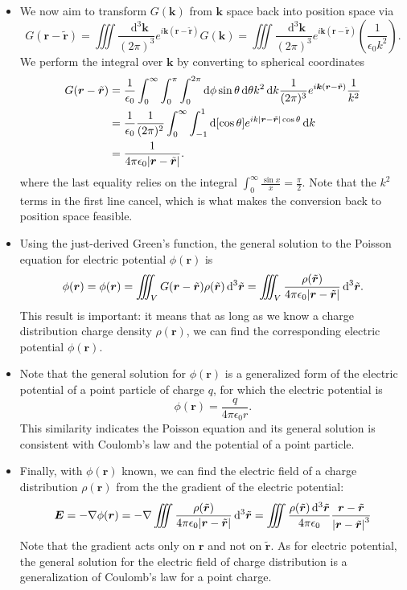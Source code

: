 \documentclass[11pt, a4paper]{article}
\newcommand{\diff}{\mathop{}\!\mathrm{d}} %
\newcommand{\dtr}{\diff^{3} \tilde{\r}}  %
\newcommand{\dk}{\diff^{3} \vec{k}}  %
\renewcommand{\vec}[1]{\bm{#1}} %
\renewcommand{\t}[1]{\tilde{#1}} %
\renewcommand{\r}{\vec{r}}
\renewcommand{\k}{\vec{k}}
\newcommand{\E}{\vec{E}} %
\newcommand{\ee}{\epsilon_{0}}  %
\renewcommand{\grad}{\nabla}
\begin{document}
\begin{itemize}
	\item We now aim to transform $ G(\k) $ from $ \k $ space back into position space via
	\begin{equation*}
		G(\r - \t{\r}) = \iiint \frac{\dk}{(2\pi)^{3}}e^{i\k(\r - \t{\r})}G(\k) = \iiint \frac{\dk}{(2\pi)^{3}}e^{i\k(\r - \t{\r})}\left(\frac{1}{\ee k^{2}}\right).
	\end{equation*}
	We perform the integral over $ \k $ by converting to spherical coordinates
	\begin{align*}
		G(\r - \t{\r}) &= \frac{1}{\ee}\int_{0}^{\infty} \int_{0}^{\pi} \int_{0}^{2\pi} \diff \phi \sin \theta \diff \theta k^{2} \diff k \frac{1}{(2\pi)^{3}}e^{i\k(\r - \t{\r})} \frac{1}{k^{2}} \\
		& = \frac{1}{\ee}\frac{1}{(2\pi)^{2}}\int_{0}^{\infty} \int_{-1}^{1} \diff [\cos \theta]  e^{ik\abs{\r - \t{\r}}\cos \theta} \diff k\\
		& = \frac{1}{4\pi \ee \abs{\r - \t{\r}}}.
	\end{align*}
	where the last equality relies on the integral $ \int_{0}^{\infty}\frac{\sin x}{x} = \frac{\pi}{2} $. Note that the $ k^{2} $ terms in the first line cancel, which is what makes the conversion back to position space feasible.
	
	\item  Using the just-derived Green's function, the general solution to the Poisson equation for electric potential $ \phi(\r) $  is
	\begin{equation*}
		\phi(\r) = \phi(\r) = \iiint_{V} G(\r - \t{\r})\rho(\t{\r}) \dtr = \iiint_{V} \frac{\rho(\t{\r})}{4\pi \ee \abs{\r - \t{\r}}}\dtr.
	\end{equation*}
	This result is important: it means that as long as we know a charge distribution charge density $ \rho(\r) $, we can find the corresponding electric potential $ \phi(\r) $. 
	
	\item Note that the general solution for $ \phi(\r) $ is a generalized form of the electric potential of a point particle of charge $ q $, for which the electric potential is
	\begin{equation*}
		\phi(\r) = \frac{q}{4\pi \ee r}.
	\end{equation*}
	This similarity indicates the Poisson equation and its general solution is consistent with Coulomb's law and the potential of a point particle.
	

	
	\item Finally, with $ \phi(\r) $ known, we can find the electric field of a charge distribution $ \rho(\r) $ from the the gradient of the electric potential:
	\begin{equation*}
		\E = - \grad \phi(\r) = - \grad \iiint \frac{\rho(\t{\r})}{4\pi \ee \abs{\r - \t{\r}}}\dtr = \iiint \frac{\rho(\t{\r})\dtr}{4\pi \ee} \frac{\r - \t{\r}}{\abs{\r - \t{\r}}^{3}}
	\end{equation*}
	Note that the gradient acts only on $ \r $ and not on $ \t{\r} $. As for electric potential, the general solution for the electric field of charge distribution is a generalization of Coulomb's law for a point charge. 
\end{itemize}
\end{document}
